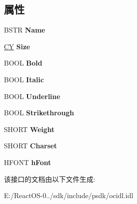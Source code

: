 \subsection*{属性}
\begin{DoxyCompactItemize}
\item 
\mbox{\label{interface_i_font_a2bc24ac0c640224b59df05fc2b169f82}} 
B\+S\+TR {\bfseries Name}
\item 
\mbox{\label{interface_i_font_a66af5f7c334c114bf293285f2f903957}} 
\hyperlink{uniontag_c_y}{CY} {\bfseries Size}
\item 
\mbox{\label{interface_i_font_aa89586a2722b31027061b902153d4a07}} 
B\+O\+OL {\bfseries Bold}
\item 
\mbox{\label{interface_i_font_a4c97835c3388c669f2b27f9628453aef}} 
B\+O\+OL {\bfseries Italic}
\item 
\mbox{\label{interface_i_font_aaee9d3990dd893d164dba422429a4ad6}} 
B\+O\+OL {\bfseries Underline}
\item 
\mbox{\label{interface_i_font_a689ca9ddb90d1c77771d1517edd28e15}} 
B\+O\+OL {\bfseries Strikethrough}
\item 
\mbox{\label{interface_i_font_a94186892138c98a5dd2805e0d6aab17d}} 
S\+H\+O\+RT {\bfseries Weight}
\item 
\mbox{\label{interface_i_font_add734302232fd22e8e6f8b6c8f7a98b1}} 
S\+H\+O\+RT {\bfseries Charset}
\item 
\mbox{\label{interface_i_font_a0093ef33f55d6ebdb7e2a31efc399ed7}} 
H\+F\+O\+NT {\bfseries h\+Font}
\end{DoxyCompactItemize}


该接口的文档由以下文件生成\+:\begin{DoxyCompactItemize}
\item 
E\+:/\+React\+O\+S-\/0../sdk/include/psdk/ocidl.\+idl\end{DoxyCompactItemize}
